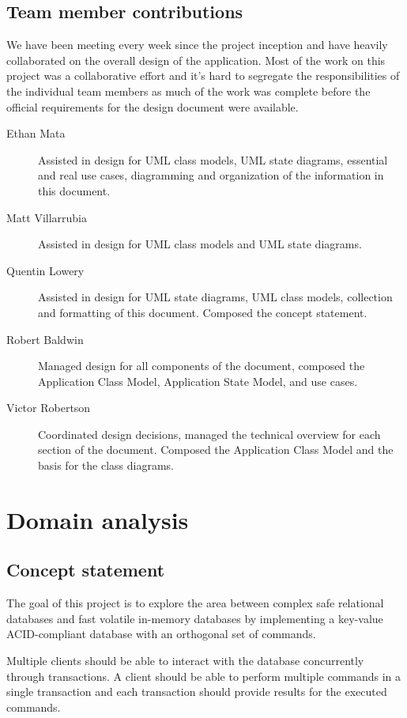 \documentclass[a4paper]{report}
\begin{document}
\section[Contributors]{Team member contributions}

We have been meeting every week since the project inception and have heavily collaborated on the overall design of the application. Most of the work on this project was a collaborative effort and it's hard to segregate the responsibilities of the individual team members as much of the work was complete before the official requirements for the design document were available.

\begin{description}
	\item[Ethan Mata] Assisted in design for UML class models, UML state diagrams, essential and real use cases, diagramming and organization of the information in this document.
	\item[Matt Villarrubia] Assisted in design for UML class models and UML state diagrams.
	\item[Quentin Lowery] Assisted in design for UML state diagrams, UML class models, collection and formatting of this document. Composed the concept statement.
	\item[Robert Baldwin] Managed design for all components of the document, composed the Application Class Model, Application State Model, and use cases.
	\item[Victor Robertson] Coordinated design decisions, managed the technical overview for each section of the document.  Composed the Application Class Model and the basis for the class diagrams.
\end{description}

\chapter{Domain analysis}

\section{Concept statement}

The goal of this project is to explore the area between complex safe relational databases and fast volatile in-memory databases by implementing a key-value ACID-compliant database with an orthogonal set of commands.

Multiple clients should be able to interact with the database concurrently through transactions. A client should be able to perform multiple commands in a single transaction and each transaction should provide results for the executed commands.
\end{document}
